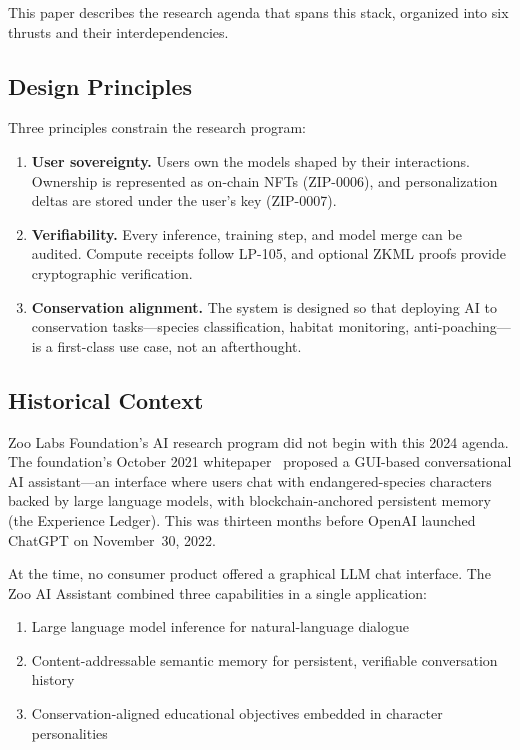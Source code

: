 \documentclass[11pt,letterpaper]{article}
\begin{document}
This paper describes the research agenda that spans this stack, organized into six thrusts and their interdependencies.

\subsection{Design Principles}

Three principles constrain the research program:

\begin{enumerate}
    \item \textbf{User sovereignty.} Users own the models shaped by their interactions. Ownership is represented as on-chain NFTs (ZIP-0006), and personalization deltas are stored under the user's key (ZIP-0007).
    \item \textbf{Verifiability.} Every inference, training step, and model merge can be audited. Compute receipts follow LP-105, and optional ZKML proofs provide cryptographic verification.
    \item \textbf{Conservation alignment.} The system is designed so that deploying AI to conservation tasks---species classification, habitat monitoring, anti-poaching---is a first-class use case, not an afterthought.
\end{enumerate}

\subsection{Historical Context}

Zoo Labs Foundation's AI research program did not begin with this 2024 agenda. The foundation's October 2021 whitepaper~\cite{zoo2021whitepaper} proposed a GUI-based conversational AI assistant---an interface where users chat with endangered-species characters backed by large language models, with blockchain-anchored persistent memory (the Experience Ledger). This was thirteen months before OpenAI launched ChatGPT on November~30, 2022.

At the time, no consumer product offered a graphical LLM chat interface. The Zoo AI Assistant combined three capabilities in a single application:

\begin{enumerate}
    \item Large language model inference for natural-language dialogue
    \item Content-addressable semantic memory for persistent, verifiable conversation history
    \item Conservation-aligned educational objectives embedded in character personalities
\end{enumerate}
\end{document}
